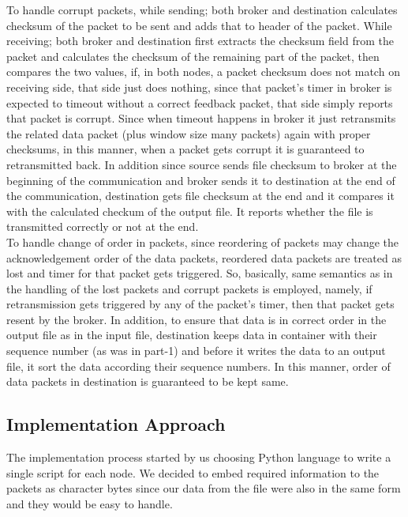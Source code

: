 \documentclass[conference]{IEEEtran}
\begin{document}
To handle corrupt packets, while sending; both broker and destination calculates checksum of the packet to be sent and adds that to header of the packet. While receiving; both broker and destination first extracts the checksum field from the packet and calculates the checksum of the remaining part of the packet, then compares the two values, if, in both nodes, a packet checksum does not match on receiving side, that side just does nothing, since that packet's timer in broker is expected to timeout without a correct feedback packet, that side simply reports that packet is corrupt. Since when timeout happens in broker it just retransmits the related data packet (plus window size many packets) again with proper checksums, in this manner, when a packet gets corrupt it is guaranteed to retransmitted back. In addition since source sends file checksum to broker at the beginning of the communication and broker sends it to destination at the end of the communication, destination gets file checksum at the end and it compares it with the calculated checkum of the output file. It reports whether the file is transmitted correctly or not at the end.\\ 

To handle change of order in packets, since reordering of packets may change the acknowledgement order of the data packets, reordered data packets are treated as lost and timer for that packet gets triggered. So, basically, same semantics as in the handling of the lost packets and corrupt packets is employed, namely, if retransmission gets triggered by any of the packet's timer, then that packet gets resent by the broker. In addition, to ensure that data is in correct order in the output file as in the input file, destination keeps data in container with their sequence number (as was in part-1) and before it writes the data to an output file, it sort the data according their sequence numbers. In this manner, order of data packets in destination is guaranteed to be kept same. 

\subsection{Implementation Approach}
The implementation process started by us choosing Python language to write a single script for each node. We decided to embed required information to the packets as character bytes since our data from the file were also in the same form and they would be easy to handle. \\
\end{document}
